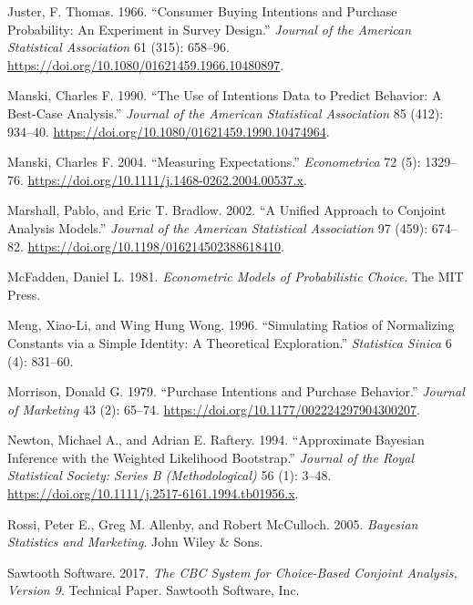 \documentclass[
  letterpaper,
  DIV=11,
  numbers=noendperiod]{scrartcl}
\newlength{\cslhangindent}
\newenvironment{CSLReferences}[2] %
 {\begin{list}{}{%
  \setlength{\itemindent}{0pt}
  \setlength{\leftmargin}{0pt}
  \setlength{\parsep}{0pt}
  \ifodd #1
   \setlength{\leftmargin}{\cslhangindent}
   \setlength{\itemindent}{-1\cslhangindent}
  \fi
  \setlength{\itemsep}{#2\baselineskip}}}
 {\end{list}}
\theoremstyle{plain}
\theoremstyle{plain}
\theoremstyle{remark}
\begin{document}
\begin{CSLReferences}{1}{1}
Juster, F. Thomas. 1966. {``Consumer Buying Intentions and Purchase
Probability: An Experiment in Survey Design.''} \emph{Journal of the
American Statistical Association} 61 (315): 658--96.
\url{https://doi.org/10.1080/01621459.1966.10480897}.

Manski, Charles F. 1990. {``The Use of Intentions Data to Predict
Behavior: A Best-Case Analysis.''} \emph{Journal of the American
Statistical Association} 85 (412): 934--40.
\url{https://doi.org/10.1080/01621459.1990.10474964}.

Manski, Charles F. 2004. {``Measuring Expectations.''}
\emph{Econometrica} 72 (5): 1329--76.
\url{https://doi.org/10.1111/j.1468-0262.2004.00537.x}.

Marshall, Pablo, and Eric T. Bradlow. 2002. {``A Unified Approach to
Conjoint Analysis Models.''} \emph{Journal of the American Statistical
Association} 97 (459): 674--82.
\url{https://doi.org/10.1198/016214502388618410}.

McFadden, Daniel L. 1981. \emph{Econometric Models of Probabilistic
Choice}. The MIT Press.

Meng, Xiao-Li, and Wing Hung Wong. 1996. {``Simulating Ratios of
Normalizing Constants via a Simple Identity: A Theoretical
Exploration.''} \emph{Statistica Sinica} 6 (4): 831--60.

Morrison, Donald G. 1979. {``Purchase Intentions and Purchase
Behavior.''} \emph{Journal of Marketing} 43 (2): 65--74.
\url{https://doi.org/10.1177/002224297904300207}.

Newton, Michael A., and Adrian E. Raftery. 1994. {``Approximate
{Bayesian} Inference with the Weighted Likelihood Bootstrap.''}
\emph{Journal of the Royal Statistical Society: Series B
(Methodological)} 56 (1): 3--48.
\url{https://doi.org/10.1111/j.2517-6161.1994.tb01956.x}.

Rossi, Peter E., Greg M. Allenby, and Robert McCulloch. 2005.
\emph{Bayesian Statistics and Marketing}. John Wiley \& Sons.

Sawtooth Software. 2017. \emph{The {CBC} System for Choice-Based
Conjoint Analysis, Version 9}. Technical Paper. Sawtooth Software, Inc.


\end{CSLReferences}
\end{document}
